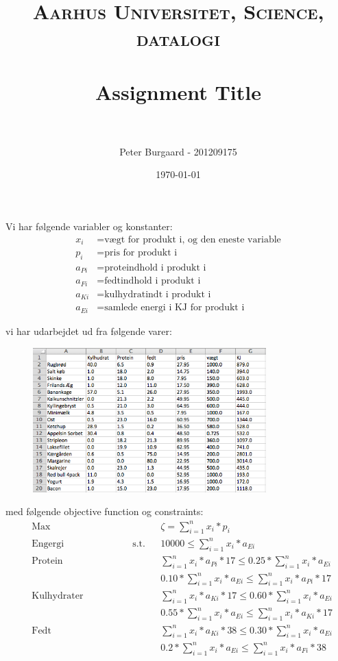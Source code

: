 \documentclass[paper=a4, fontsize=11pt]{scrartcl} %
\title{	
	\normalfont \normalsize 
	\textsc{Aarhus Universitet, Science, datalogi} \\ [25pt] %
	\horrule{0.5pt} \\[0.4cm] %
	\huge Assignment Title \\ %
	\horrule{2pt} \\[0.5cm] %
}
\author{Peter Burgaard - 201209175} %
\date{\normalsize\today} %
\begin{document}
	
	\maketitle %
	
	Vi har følgende variabler og konstanter:
	\begin{align*}
	x_i &= \text{vægt for produkt i, og den eneste variable} \\
	p_i &= \text{pris for produkt i} \\
	a_{Pi} &= \text{proteindhold i produkt i} \\
	a_{Fi} &= \text{fedtindhold i produkt i} \\
	a_{Ki} &= \text{kulhydratindt i produkt i} \\
	a_{Ei} &= \text{samlede energi i KJ for produkt i} 
	\end{align*}
	
	vi har udarbejdet ud fra følgende varer:
	\begin{figure}
		\centering
		\includegraphics[width=9cm]{tabel.png}
	\end{figure}
	
	med følgende objective function og constraints:
	\begin{align*}
	& \text{Max } &&\zeta = \sum_{i=1}^{n} x_i*p_i \\
	&\text{Engergi} \hspace{3cm} \text{s.t.} &&10000 \leq \sum_{i=1}^{n}x_i*a_{Ei}   \\
	&\text{Protein} \hspace{3cm} && \sum_{i=1}^{n}x_i*a_{Pi}*17 \leq 0.25*\sum_{i=1}^{n}x_i*a_{Ei} \\
	& && 0.10*\sum_{i=1}^{n}x_i*a_{Ei} \leq \sum_{i=1}^{n}x_i*a_{Pi}*17 \\
	& \text{Kulhydrater} &&  \sum_{i=1}^{n}x_i*a_{Ki}*17 \leq 0.60*\sum_{i=1}^{n}x_i*a_{Ei}\\
	& && 0.55*\sum_{i=1}^{n}x_i*a_{Ei} \leq \sum_{i=1}^{n}x_i*a_{Ki}*17 \\
	& \text{Fedt} &&  \sum_{i=1}^{n}x_i*a_{Ki}*38 \leq 0.30*\sum_{i=1}^{n}x_i*a_{Ei}\\
	& && 0.2*\sum_{i=1}^{n}x_i*a_{Ei} \leq \sum_{i=1}^{n}x_i*a_{Fi}*38 \\
	\end{align*}
	
\end{document}
